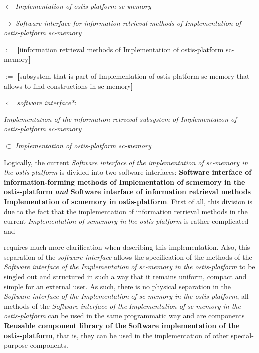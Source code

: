 \documentclass[10pt, twocolumn, a4paper]{article}
\begin{document}
\begin{level1}
\begin{level1}
\begin{level1}
\item[$\subset$] \textit{Implementation of ostis-platform sc-memory}
 \end{level1}
\end{level1}

\item[$\supset$] \textit{Software interface for information retrieval methods of Implementation of ostis-platform sc-memory}
\begin{level1}

\item[$:=$] \textbf{[}iinformation retrieval methods of Implementation of ostis-platform sc-memory\textbf{]}
\item[$:=$] \textbf{[}subsystem that is part of Implementation of ostis-platform sc-memory that allows to find constructions in sc-memory\textbf{]}
\item [ $\Leftarrow$]  \textit{software interface*}:
\item[] \textit{Implementation of the information retrieval subsystem of Implementation of ostis-platform sc-memory}
\begin{level1}
\item[$\subset$] \textit{Implementation of ostis-platform sc-memory} \\ 
 \end{level1}
 \end{level1}
 \end{level1}
 
\par Logically, the current \textit{Software interface of the implementation of sc-memory in the ostis-platform} is divided into two software interfaces: \textbf{Software interface of information-forming methods of Implementation of scmemory in the ostis-platform \emph {and} Software interface of information retrieval methods Implementation of scmemory in ostis-platform}. First of all, this division is due to the fact that the implementation of information retrieval methods in the current \textit{Implementation of scmemory in the ostis platform} is rather complicated and


\newpage




 
\noindent  requires much more clarification when describing this implementation. Also, this separation of the \textit{software interface} allows the specification of the methods of the \textit{Software interface of the Implementation of sc-memory in the ostis-platform} to be singled out and structured in such a way that it remains uniform, compact and simple for an external user. As such, there is no physical separation in the \textit{Software interface of the Implementation of sc-memory in the ostis-platform}, all methods of the \textit{Software interface of the Implementation of sc-memory in the ostis-platform} can be used in the same programmatic way and are components\textbf{ Reusable component library of the Software implementation of the ostis-platform}, that is, they can be used in the implementation of other special-purpose components.
\end{document}
